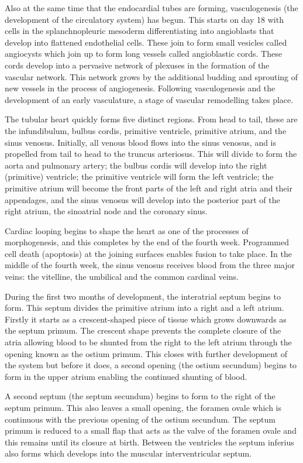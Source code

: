 Also at the same time that the endocardial tubes are forming, vasculogenesis (the development of the circulatory system) has begun. This starts on day 18 with cells in the splanchnopleuric mesoderm differentiating into angioblasts that develop into flattened endothelial cells. These join to form small vesicles called angiocysts which join up to form long vessels called angioblastic cords. These cords develop into a pervasive network of plexuses in the formation of the vascular network. This network grows by the additional budding and sprouting of new vessels in the process of angiogenesis. Following vasculogenesis and the development of an early vasculature, a stage of vascular remodelling takes place.

The tubular heart quickly forms five distinct regions. From head to tail, these are the infundibulum, bulbus cordis, primitive ventricle, primitive atrium, and the sinus venosus. Initially, all venous blood flows into the sinus venosus, and is propelled from tail to head to the truncus arteriosus. This will divide to form the aorta and pulmonary artery; the bulbus cordis will develop into the right (primitive) ventricle; the primitive ventricle will form the left ventricle; the primitive atrium will become the front parts of the left and right atria and their appendages, and the sinus venosus will develop into the posterior part of the right atrium, the sinoatrial node and the coronary sinus.

Cardiac looping begins to shape the heart as one of the processes of morphogenesis, and this completes by the end of the fourth week. Programmed cell death (apoptosis) at the joining surfaces enables fusion to take place. In the middle of the fourth week, the sinus venosus receives blood from the three major veins: the vitelline, the umbilical and the common cardinal veins.

During the first two months of development, the interatrial septum begins to form. This septum divides the primitive atrium into a right and a left atrium. Firstly it starts as a crescent-shaped piece of tissue which grows downwards as the septum primum. The crescent shape prevents the complete closure of the atria allowing blood to be shunted from the right to the left atrium through the opening known as the ostium primum. This closes with further development of the system but before it does, a second opening (the ostium secundum) begins to form in the upper atrium enabling the continued shunting of blood.

A second septum (the septum secundum) begins to form to the right of the septum primum. This also leaves a small opening, the foramen ovale which is continuous with the previous opening of the ostium secundum. The septum primum is reduced to a small flap that acts as the valve of the foramen ovale and this remains until its closure at birth. Between the ventricles the septum inferius also forms which develops into the muscular interventricular septum.

